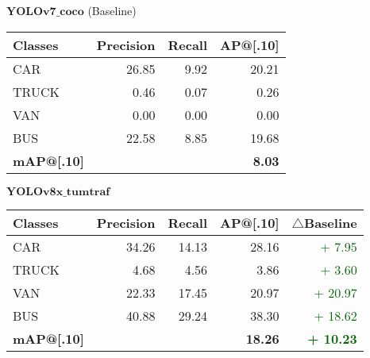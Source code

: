 \begin{table}[htb]%
	\centering
	\scriptsize
	\setlength\tabcolsep{4pt}
	\hspace{-3em} %
	\begin{minipage}{\textwidth}
		\begin{minipage}[t]{0.48\textwidth}
			\centering 
			$\bm{YOLOv7\_coco}$ (Baseline)\\
			\begin{tabular}{lrrr}
				\toprule
				\textbf{Classes} & \textbf{Precision} & \textbf{Recall} & \textbf{AP@[.10]} \\
				\midrule
				CAR & 26.85 & 9.92 & 20.21  \\
				TRUCK & 0.46 & 0.07 & 0.26  \\
				VAN & 0.00 & 0.00 & 0.00  \\
				BUS & 22.58 & 8.85 & 19.68  \\
				\midrule
				\textbf{mAP@[.10]} & \textbf{} & \textbf{} & \textbf{8.03}   \\
				\bottomrule
			\end{tabular}
		\end{minipage}%
		\hfill
		\begin{minipage}[t]{0.48\textwidth}
			\centering 
			$\bm{YOLOv8x\_tumtraf}$\\
			\begin{tabular}{lrrrr}
				\toprule
				\textbf{Classes} & \textbf{Precision} & \textbf{Recall} & \textbf{AP@[.10]} & \textbf{$\triangle$Baseline} \\
				\midrule
				CAR & 34.26 & 14.13 & 28.16 &  \textcolor{darkgreen}{+ 7.95}\\
				TRUCK & 4.68 & 4.56 & 3.86 &  \textcolor{darkgreen}{+ 3.60}\\
				VAN & 22.33 & 17.45 & 20.97 & \textcolor{darkgreen}{+ 20.97}\\
				BUS & 40.88 & 29.24 & 38.30 & \textcolor{darkgreen}{+ 18.62}\\
				\midrule
				\textbf{mAP@[.10]} & \textbf{} & \textbf{} & \textbf{18.26}   & \textbf{\textcolor{darkgreen}{+ 10.23}} \\
				\bottomrule
			\end{tabular}
		\end{minipage}
	\end{minipage}
	

\end{table}
